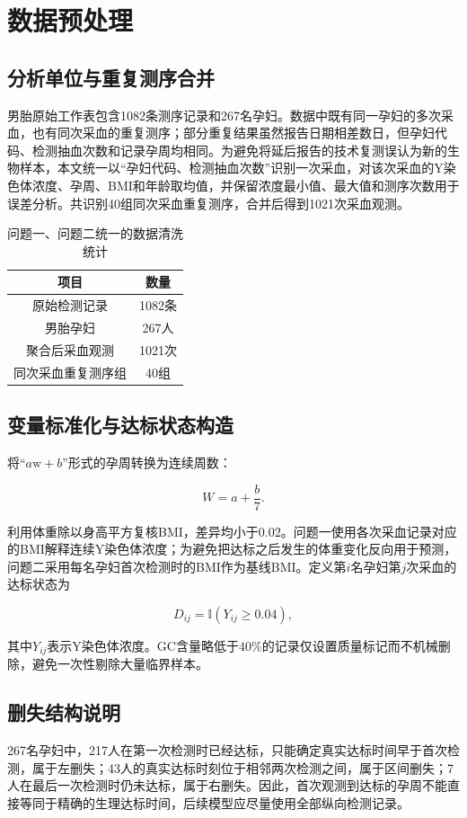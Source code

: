 \section{数据预处理}

\subsection{分析单位与重复测序合并}

男胎原始工作表包含1082条测序记录和267名孕妇。数据中既有同一孕妇的多次采血，也有同次采血的重复测序；部分重复结果虽然报告日期相差数日，但孕妇代码、检测抽血次数和记录孕周均相同。为避免将延后报告的技术复测误认为新的生物样本，本文统一以“孕妇代码、检测抽血次数”识别一次采血，对该次采血的Y染色体浓度、孕周、BMI和年龄取均值，并保留浓度最小值、最大值和测序次数用于误差分析。共识别40组同次采血重复测序，合并后得到1021次采血观测。

\begin{table}[H]
  \centering
  \caption{问题一、问题二统一的数据清洗统计}
  \label{tab:male-clean-summary}
  \begin{tabular}{cc}
    \toprule
    项目 & 数量 \\
    \midrule
    原始检测记录 & 1082条 \\
    男胎孕妇 & 267人 \\
    聚合后采血观测 & 1021次 \\
    同次采血重复测序组 & 40组 \\
    \bottomrule
  \end{tabular}
\end{table}

\subsection{变量标准化与达标状态构造}

将“$a\mathrm{w}+b$”形式的孕周转换为连续周数：

\begin{equation}
  W=a+\frac{b}{7}.
  \label{eq:week-convert}
\end{equation}

利用体重除以身高平方复核BMI，差异均小于0.02。问题一使用各次采血记录对应的BMI解释连续Y染色体浓度；为避免把达标之后发生的体重变化反向用于预测，问题二采用每名孕妇首次检测时的BMI作为基线BMI。定义第$i$名孕妇第$j$次采血的达标状态为

\begin{equation}
  D_{ij}=\mathbb{I}\!\left(Y_{ij}\geq 0.04\right),
  \label{eq:q2-status}
\end{equation}

其中$Y_{ij}$表示Y染色体浓度。GC含量略低于$40\%$的记录仅设置质量标记而不机械删除，避免一次性剔除大量临界样本。

\subsection{删失结构说明}

267名孕妇中，217人在第一次检测时已经达标，只能确定真实达标时间早于首次检测，属于左删失；43人的真实达标时刻位于相邻两次检测之间，属于区间删失；7人在最后一次检测时仍未达标，属于右删失。因此，首次观测到达标的孕周不能直接等同于精确的生理达标时间，后续模型应尽量使用全部纵向检测记录。
